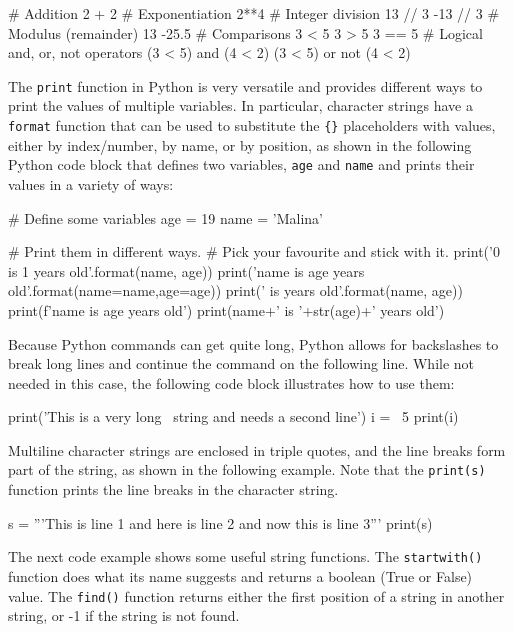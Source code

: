 \begin{pythoncode}
# Addition
2 + 2
# Exponentiation
2**4
# Integer division
13 // 3
-13 // 3
# Modulus (remainder)
13 %
-25.5 %
# Comparisons
3 < 5
3 > 5
3 == 5
# Logical and, or, not operators
(3 < 5) and (4 < 2)
(3 < 5) or not (4 < 2)
\end{pythoncode}

The \texttt{print} function in Python is very versatile and provides different ways to print the values of multiple variables. In particular, character strings have a \texttt{format} function that can be used to substitute the \texttt{\{\}} placeholders with values, either by index/number, by name, or by position, as shown in the following Python code block that defines two variables, \texttt{age} and \texttt{name} and prints their values in a variety of ways:

\begin{pythoncode}
# Define some variables
age = 19
name = 'Malina'

# Print them in different ways. 
# Pick your favourite and stick with it.
print('{0} is {1} years old'.format(name, age))
print('{name} is {age} years old'.format(name=name,age=age))
print('{} is {} years old'.format(name, age))
print(f'{name} is {age} years old')
print(name+' is '+str(age)+' years old')
\end{pythoncode}

\noindent Because Python commands can get quite long, Python allows for backslashes to break long lines and continue the command on the following line. While not needed in this case, the following code block illustrates how to use them:

\begin{pythoncode}
print('This is a very long \
string and needs a second line')
i = \
5
print(i)
\end{pythoncode}

\noindent Multiline character strings are enclosed in triple quotes, and the line breaks form part of the string, as shown in the following example. Note that the \texttt{print(s)} function prints the line breaks in the character string.

\begin{pythoncode}
s = '''This is line 1
and here is line 2
and now this is line 3'''
print(s)
\end{pythoncode}

\noindent The next code example shows some useful string functions. The \texttt{startwith()} function does what its name suggests and returns a boolean (True or False) value. The \texttt{find()} function returns either the first position of a string in another string, or -1 if the string is not found. 

